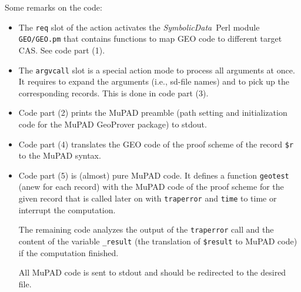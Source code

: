 \documentclass[11pt]{article}
\newcommand{\SD}{{\it Symbo\-lic\-Data}}
\begin{document}
Some remarks on the code:
\begin{itemize}\itemsep-2pt
\item The {\tt req} slot of the action activates the \SD\ Perl
module {\tt GEO/GEO.pm} that contains functions to map GEO code
to different target CAS. See code part (1).
\item The {\tt argvcall} slot is a special action mode to process
all arguments at once. It requires to expand the arguments (i.e.,
sd-file names) and to pick up the corresponding records. This is
done in code part (3).
\item Code part (2) prints the MuPAD preamble (path setting and
initialization code for the MuPAD GeoProver package) to stdout.
\item Code part (4) translates the GEO code of the proof scheme
of the record {\tt \$r} to the MuPAD syntax.
\item Code part (5) is (almost) pure MuPAD code. It defines a
function {\tt geotest} (anew for each record) with the MuPAD code
of the proof scheme for the given record that is called later on
with {\tt traperror} and {\tt time} to time or interrupt the
computation. 

The remaining code analyzes the output of the {\tt traperror}
call and the content of the variable {\tt \_result} (the
translation of {\tt \$result} to MuPAD code) if the computation
finished. 

All MuPAD code is sent to stdout and should be redirected to the
desired file.
\end{itemize}
\end{document}
